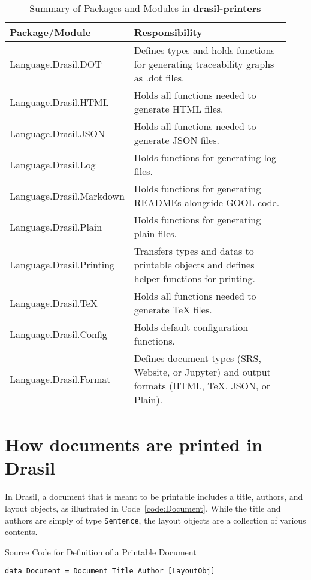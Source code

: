 \begin{longtable}[c]{|>{\raggedright}p{0.32\linewidth}|>{\raggedright\arraybackslash}p{0.61\linewidth}|}
	\caption{Summary of Packages and Modules in \textbf{drasil-printers}} 
	\label{tab:printerpacks}                                              
	\\ \hline
	
	\rowcolor{McMasterMediumGrey}
	\textbf{Package/Module} & \textbf{Responsibility}
	\\ \hline
	
	Language.Drasil.DOT & Defines types and holds functions for generating 
	traceability graphs as .dot files. 
	\\ \hline
	Language.Drasil.HTML & Holds all functions needed to generate HTML files. 
	\\ \hline
	Language.Drasil.JSON & Holds all functions needed to generate JSON files. 
	\\ \hline
	Language.Drasil.Log & Holds functions for generating log files. 
	\\ \hline
	Language.Drasil.Markdown & Holds functions for generating READMEs alongside 
	GOOL code.
	\\ \hline
	Language.Drasil.Plain & Holds functions for generating plain files.
	\\ \hline
	Language.Drasil.Printing & Transfers types and datas to printable objects 
	and defines helper functions for printing.
	\\ \hline
	Language.Drasil.TeX & Holds all functions needed to generate TeX files. 
	\\ \hline
	Language.Drasil.Config & Holds default configuration functions. 
	\\ \hline
	Language.Drasil.Format & Defines document types (SRS, Website, or Jupyter) 
	and output formats (HTML, TeX, JSON, or Plain).
	\\ \hline
\end{longtable}

\section{How documents are printed in Drasil}
In Drasil, a document that is meant to be printable includes a title, authors, 
and layout objects, as illustrated in Code~\ref{code:Document}. While the title 
and authors are simply of type \texttt{Sentence}, the layout objects are a 
collection of various contents.

\begin{listing}[h]
	\caption{Source Code for Definition of a Printable Document}
	\label{code:Document}
	\begin{lstlisting}[language=haskell1]
		data Document = Document Title Author [LayoutObj]
	\end{lstlisting}
\end{listing}

